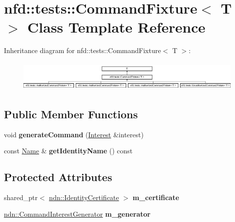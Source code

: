 \hypertarget{classnfd_1_1tests_1_1CommandFixture}{}\section{nfd\+:\+:tests\+:\+:Command\+Fixture$<$ T $>$ Class Template Reference}
\label{classnfd_1_1tests_1_1CommandFixture}
Inheritance diagram for nfd\+:\+:tests\+:\+:Command\+Fixture$<$ T $>$\+:\begin{figure}[H]
\begin{center}
\leavevmode
\includegraphics[height=1.532847cm]{classnfd_1_1tests_1_1CommandFixture}
\end{center}
\end{figure}
\subsection*{Public Member Functions}
\begin{DoxyCompactItemize}
\item 
void {\bfseries generate\+Command} (\hyperlink{classndn_1_1Interest}{Interest} \&interest)\hypertarget{classnfd_1_1tests_1_1CommandFixture_a122c0725a3d41facb9ac3b9a46dfab8e}{}\label{classnfd_1_1tests_1_1CommandFixture_a122c0725a3d41facb9ac3b9a46dfab8e}

\item 
const \hyperlink{classndn_1_1Name}{Name} \& {\bfseries get\+Identity\+Name} () const\hypertarget{classnfd_1_1tests_1_1CommandFixture_a6dd3c1a7d073fc3454c6b3d40de5b180}{}\label{classnfd_1_1tests_1_1CommandFixture_a6dd3c1a7d073fc3454c6b3d40de5b180}

\end{DoxyCompactItemize}
\subsection*{Protected Attributes}
\begin{DoxyCompactItemize}
\item 
shared\+\_\+ptr$<$ \hyperlink{classndn_1_1IdentityCertificate}{ndn\+::\+Identity\+Certificate} $>$ {\bfseries m\+\_\+certificate}\hypertarget{classnfd_1_1tests_1_1CommandFixture_ae9fcc8c2ec6bccedf11f9f6798976203}{}\label{classnfd_1_1tests_1_1CommandFixture_ae9fcc8c2ec6bccedf11f9f6798976203}

\item 
\hyperlink{classndn_1_1CommandInterestGenerator}{ndn\+::\+Command\+Interest\+Generator} {\bfseries m\+\_\+generator}\hypertarget{classnfd_1_1tests_1_1CommandFixture_af97a4e0a46d8be2934879b73d6151609}{}\label{classnfd_1_1tests_1_1CommandFixture_af97a4e0a46d8be2934879b73d6151609}

\end{DoxyCompactItemize}


